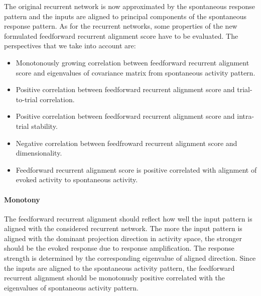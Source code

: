 \documentclass[11pt]{article}
\begin{document}
	The original recurrent network is now approximated by the spontaneous response pattern and the inputs are aligned to principal components of the spontaneous response pattern. As for the recurrent networks, some properties of the new formulated feedforward recurrent alignment score have to be evaluated. The perspectives that we take into account are:
		\begin{itemize}
			\item Monotonously growing correlation between feedforward recurrent alignment score and eigenvalues of covariance matrix from spontaneous activity pattern.
			\item Positive correlation between feedforward recurrent alignment score and trial-to-trial correlation.
			\item Positive correlation between feedforward recurrent alignment score and intra-trial stability.
			\item Negative correlation between feedfroward recurrent alignment score and dimensionality.
			\item Feedforward recurrent alignment score is positive correlated with alignment of evoked activity to spontaneous activity.
		\end{itemize}
	
	\paragraph{Monotony} The feedforward recurrent alignment should reflect how well the input pattern is aligned with the considered recurrent network. The more the input pattern is aligned with the dominant projection direction in activity space, the stronger should be the evoked response due to response amplification. %
	The response strength is determined by the corresponding eigenvalue of aligned direction. Since the inputs are aligned to the spontaneous activity pattern, the feedforward recurrent alignment should be monotonusly positive correlated with the eigenvalues of spontaneous activity pattern. 
	
\end{document}

